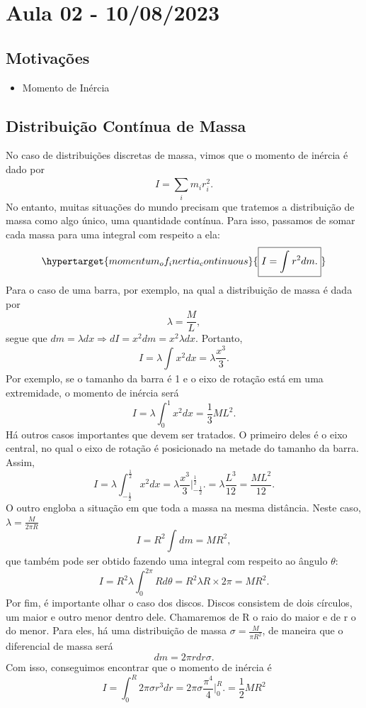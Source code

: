\documentclass{article}
\begin{document}
\section{Aula 02 - 10/08/2023}
\subsection{Motivações}
 \begin{itemize}
   \item Momento de Inércia
 \end{itemize}
\subsection{Distribuição Contínua de Massa}
  No caso de distribuições discretas de massa, vimos que o momento de inércia é dado por 
    \[
      I=\sum\limits_{i}^{}m_{i}r_{i}^{2}.
    \]
No entanto, muitas situações do mundo precisam que tratemos a distribuição de massa como algo único, uma
quantidade contínua. Para isso, passamos de somar cada massa para uma integral com respeito a ela: 
  \[
    \hypertarget{momentum_of_inertia_continuous}{\boxed{I = \int_{}^{}r^{2}dm.}}
  \]
  Para o caso de uma barra, por exemplo, na qual a distribuição de massa é dada por 
    \[
      \lambda = \frac{M}{L},
    \]
  segue que \(dm = \lambda dx \Rightarrow dI = x^{2}dm = x^{2}\lambda dx\). Portanto, 
    \[
      I = \lambda \int_{}^{}x^{2}dx = \lambda \frac{x^{3}}{3}.
    \]
  Por exemplo, se o tamanho da barra é 1 e o eixo de rotação está em uma extremidade, o momento de inércia será 
    \[
      I = \lambda \int_{0}^{1}x^{2}dx =\frac{1}{3}ML^{2}.
    \]
    Há outros casos importantes que devem ser tratados. O primeiro deles é o eixo central,
  no qual o eixo de rotação é posicionado na metade do tamanho da barra. Assim, 
    \[
      I = \lambda \int_{-\frac{1}{2}}^{\frac{1}{2}}x^{2}dx = \lambda \frac{x^{3}}{3}\biggl|_{-\frac{1}{2}}^{\frac{1}{2}}\biggr. = \lambda \frac{L^{3}}{12} = \frac{ML^{2}}{12}.
    \]
  O outro engloba a situação em que toda a massa na mesma distância. Neste caso, \(\lambda = \frac{M}{2\pi R}\)
    \[
      I = R^{2} \int_{}^{}dm = MR^{2}, 
    \]
  que também pode ser obtido fazendo uma integral com respeito ao ângulo \(\theta \): 
    \[
      I = R^{2}\lambda \int_{0}^{2\pi } R d\theta = R^{2}\lambda R\times2\pi = MR^{2}.
    \]
  Por fim, é importante olhar o caso dos discos. Discos consistem de dois círculos, um maior e outro menor dentro dele.
Chamaremos de R o raio do maior e de r o do menor. Para eles, há uma distribuição de massa
 \(\sigma = \frac{M}{\pi R^{2}}\), de maneira que o diferencial de massa será 
   \[
     dm = 2\pi r dr\sigma.
   \]
   Com isso, conseguimos encontrar que o momento de inércia é 
     \[
       I = \int_{0}^{R}2\pi \sigma r^{3}dr = 2\pi \sigma \frac{\pi^{4}}{4}\biggl|_{0}^{R}\biggr. = \frac{1}{2}MR^{2}
     \]
\end{document}
